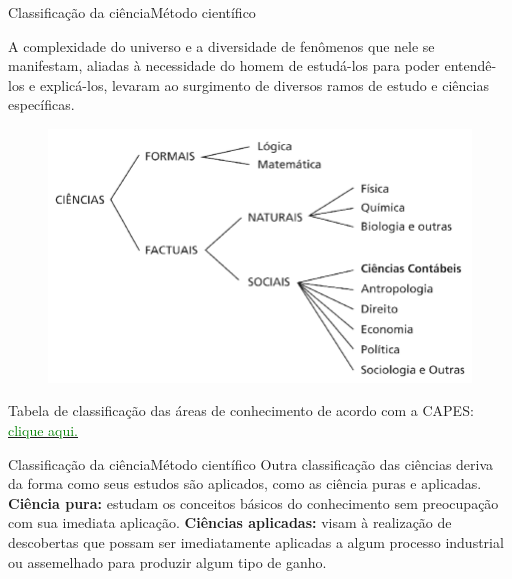 \documentclass[t]{beamer}
\begin{document}
\begin{ftst}{Classificação da ciência}{Método científico}

A complexidade do universo e a diversidade de fenômenos que nele se manifestam, aliadas à necessidade do homem de estudá-los para poder entendê-los e explicá-los, levaram ao surgimento de diversos ramos de estudo e ciências específicas.

\begin{figure}
    \centering
    \includegraphics[scale=0.25]{Figuras/01_classificacao_ciencia.png}
    \label{fig:classificacao_ciencia}
\end{figure}

\scriptsize
Tabela de classificação das áreas de conhecimento de acordo com a CAPES: \href{http://lattes.cnpq.br/documents/11871/24930/TabeladeAreasdoConhecimento.pdf/d192ff6b-3e0a-4074-a74d-c280521bd5f7}{\textcolor{green}{clique aqui.}}

\end{ftst}



\begin{ftst}{Classificação da ciência}{Método científico}
\justifying
Outra classificação das ciências deriva da forma como seus estudos são aplicados, como as ciência puras e aplicadas.
\vone
\textbf{Ciência pura:} estudam os conceitos básicos do conhecimento sem preocupação com sua imediata aplicação.
\vone
\textbf{Ciências aplicadas:} visam à realização de descobertas que possam ser imediatamente aplicadas a algum processo industrial ou assemelhado para produzir algum tipo de ganho.

\end{ftst}

\end{document}
